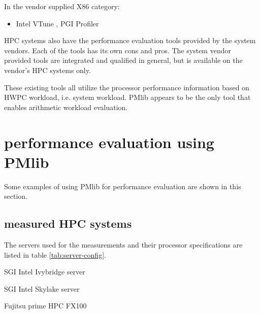 \documentclass[conference]{IEEEtran}
\begin{document}
In the vendor supplied X86 category:
\begin{itemize}
		\item Intel VTune \cite{Intel:VTune}, PGI Profiler \cite{PGI:Profiler}
\end{itemize}

HPC systems also have the performance evaluation tools provided by the
system vendors.
Each of the tools has its own cons and pros.
The system vendor provided tools are integrated and qualified in general,
but is available on the vendor's HPC systems only.

These existing tools all utilize the processor performance information
based on HWPC workload, i.e. system workload.
PMlib appears to be the only tool that enables arithmetic workload evaluation.


\section{performance evaluation using PMlib}
\label{section:using-PMlib}

Some examples of using PMlib for performance evaluation are shown in this
section.

\subsection{measured HPC systems}
The servers used for the measurements and their processor specifications
are listed in table \ref{tab:server-config}.
\begin{itemize}
{
\item SGI Intel Ivybridge server
\item SGI Intel Skylake server
\item Fujitsu prime HPC FX100
}
\end{itemize}
\end{document}
